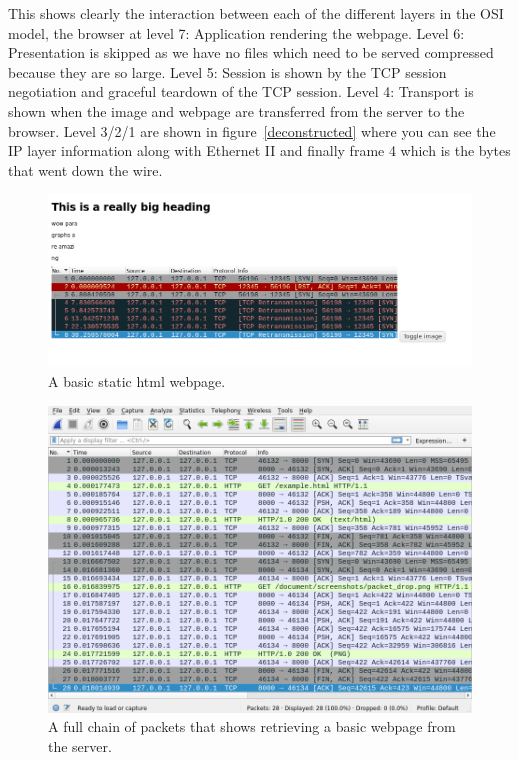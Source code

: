 \documentclass[titlepage]{article}
\begin{document}
This shows clearly the interaction between each of the different layers in the OSI model,
the browser at level 7: Application rendering the webpage. Level 6: Presentation is skipped as
we have no files which need to be served compressed because they are so large. Level 5: Session
is shown by the TCP session negotiation and graceful teardown of the TCP session. Level 4: Transport
is shown when the image and webpage are transferred from the server to the browser. Level 3/2/1
are shown in figure~\ref{deconstructed} where you can see the IP layer information along with
Ethernet II and finally frame 4 which is the bytes that went down the wire.


\begin{figure}[H]
  \centering
  \includegraphics[width=\textwidth]{screenshots/basic_webpage.png}
  \caption{%
    A basic static \gls{html} webpage.
  }\label{basicwebpage}
\end{figure}

\begin{figure}[H]
  \centering
  \includegraphics[width=\textwidth]{screenshots/website_get.png}
  \caption{%
    A full chain of packets that shows retrieving a basic webpage
    from the server.
  }\label{getrequest}
\end{figure}
\end{document}
